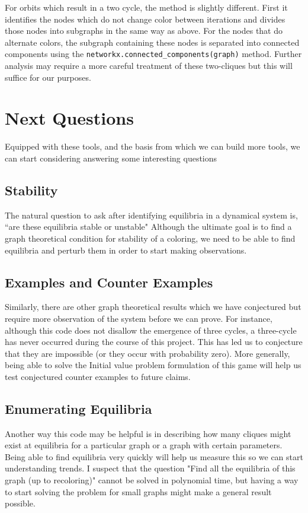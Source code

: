 \documentclass[]{article}
\begin{document}
For orbits which result in a two cycle, the method is slightly different. First it identifies the nodes which do not change color between iterations and divides those nodes into subgraphs in the same way as above. For the nodes that do alternate colors, the subgraph containing these nodes is separated into connected components using the \verb*|networkx.connected_components(graph)| method. Further analysis may require a more careful treatment of these two-cliques but this will suffice for our purposes. 

\section{Next Questions}
Equipped with these tools, and the basis from which we can build more tools, we can start considering answering some interesting questions
\subsection{Stability}
The natural question to ask after identifying equilibria in a dynamical system is, ``are these equilibria stable or unstable" Although the ultimate goal is to find a graph theoretical condition for stability of a coloring, we need to be able to find equilibria and perturb them in order to start making observations.
\subsection{Examples and Counter Examples}
Similarly, there are other graph theoretical results which we have conjectured but require more observation of the system before we can prove. For instance, although this code does not disallow the emergence of three cycles, a three-cycle has never occurred during the course of this project. This has led us to conjecture that they are impossible (or they occur with probability zero). More generally, being able to solve the Initial value problem formulation of this game will help us test conjectured counter examples to future claims.
\subsection{Enumerating Equilibria}
Another way this code may be helpful is in describing how many cliques might exist at equilibria for a particular graph or a graph with certain parameters. Being able to find equilibria very quickly will help us measure this so we can start understanding trends. I suspect that the question "Find all the equilibria of this graph (up to recoloring)" cannot be solved in polynomial time, but having a way to start solving the problem for small graphs might make a general result possible. 
\end{document}
